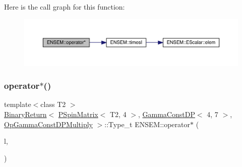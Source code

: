 Here is the call graph for this function\+:\nopagebreak
\begin{figure}[H]
\begin{center}
\leavevmode
\includegraphics[width=350pt]{d6/df5/group__primspinmatrix_gac2a770f56cbf8ef3fd61c80d05ee306e_cgraph}
\end{center}
\end{figure}
\mbox{\label{group__primspinmatrix_ga4540a205b423306c3a0d322e81d75d2d}} 
\subsubsection{\texorpdfstring{operator$\ast$()}{operator*()}\hspace{0.1cm}{\footnotesize\ttfamily [56/64]}}
{\footnotesize\ttfamily template$<$class T2 $>$ \\
\mbox{\hyperlink{structENSEM_1_1BinaryReturn}{Binary\+Return}}$<$ \mbox{\hyperlink{classENSEM_1_1PSpinMatrix}{P\+Spin\+Matrix}}$<$ T2, 4 $>$, \mbox{\hyperlink{classENSEM_1_1GammaConstDP}{Gamma\+Const\+DP}}$<$ 4, 7 $>$, \mbox{\hyperlink{structENSEM_1_1OpGammaConstDPMultiply}{Op\+Gamma\+Const\+D\+P\+Multiply}} $>$\+::Type\+\_\+t E\+N\+S\+E\+M\+::operator$\ast$ (\begin{DoxyParamCaption}\item[{const \mbox{\hyperlink{classENSEM_1_1PSpinMatrix}{P\+Spin\+Matrix}}$<$ T2, 4 $>$ \&}]{l,  }\item[{const \mbox{\hyperlink{classENSEM_1_1GammaConstDP}{Gamma\+Const\+DP}}$<$ 4, 7 $>$ \&}]{ }\end{DoxyParamCaption})\hspace{0.3cm}{\ttfamily [inline]}}

\mbox{\label{group__primspinmatrix_gaf745fe661bcdf107b27bf22e48d36d3e}} 
